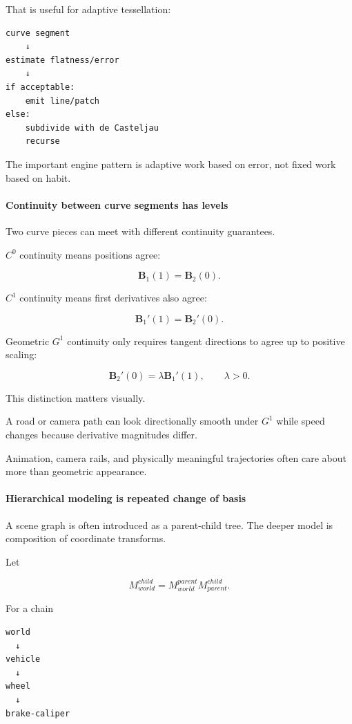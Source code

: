 That is useful for adaptive tessellation:

\begin{verbatim}
curve segment
    ↓
estimate flatness/error
    ↓
if acceptable:
    emit line/patch
else:
    subdivide with de Casteljau
    recurse
\end{verbatim}

The important engine pattern is adaptive work based on error, not fixed work based on habit.

\paragraph{Continuity between curve segments has levels}\label{continuity-between-curve-segments-has-levels}

Two curve pieces can meet with different continuity guarantees.

\(C^0\) continuity means positions agree:

\[
\mathbf B_1(1)=\mathbf B_2(0).
\]

\(C^1\) continuity means first derivatives also agree:

\[
\mathbf B_1'(1)=\mathbf B_2'(0).
\]

Geometric \(G^1\) continuity only requires tangent directions to agree up to positive scaling:

\[
\mathbf B_2'(0)=\lambda\mathbf B_1'(1),
\qquad
\lambda>0.
\]

This distinction matters visually.

A road or camera path can look directionally smooth under \(G^1\) while speed changes because derivative magnitudes differ.

Animation, camera rails, and physically meaningful trajectories often care about more than geometric appearance.

\paragraph{Hierarchical modeling is repeated change of basis}\label{hierarchical-modeling-is-repeated-change-of-basis}

A scene graph is often introduced as a parent-child tree. The deeper model is composition of coordinate transforms.

Let

\[
M_{world}^{child}
=
M_{world}^{parent}
M_{parent}^{child}.
\]

For a chain

\begin{verbatim}
world
  ↓
vehicle
  ↓
wheel
  ↓
brake-caliper
\end{verbatim}

